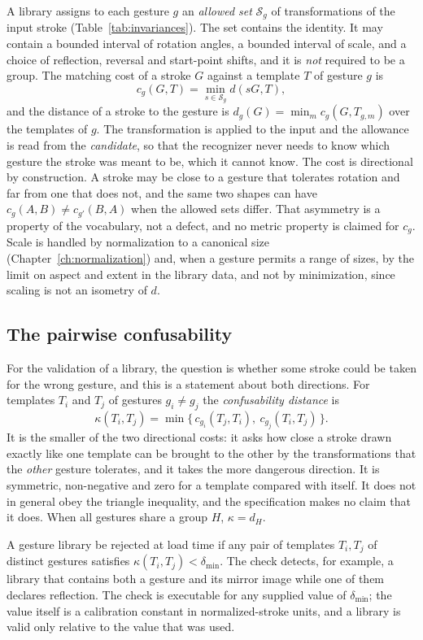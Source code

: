 A library assigns to each gesture $g$ an \emph{allowed set} $\mathcal S_g$ of transformations of the input stroke (Table~\ref{tab:invariances}). The set contains the identity. It may contain a bounded interval of rotation angles, a bounded interval of scale, and a choice of reflection, reversal and start-point shifts, and it is \emph{not} required to be a group. The matching cost of a stroke $G$ against a template $T$ of gesture $g$ is
\[
c_g(G,T)=\min_{s\in\mathcal S_g} d(sG,T),
\]
and the distance of a stroke to the gesture is $d_g(G)=\min_m c_g(G,T_{g,m})$ over the templates of $g$. The transformation is applied to the input and the allowance is read from the \emph{candidate}, so that the recognizer never needs to know which gesture the stroke was meant to be, which it cannot know. The cost is directional by construction. A stroke may be close to a gesture that tolerates rotation and far from one that does not, and the same two shapes can have $c_{g}(A,B)\ne c_{g'}(B,A)$ when the allowed sets differ. That asymmetry is a property of the vocabulary, not a defect, and no metric property is claimed for $c_g$. Scale is handled by normalization to a canonical size (Chapter~\ref{ch:normalization}) and, when a gesture permits a range of sizes, by the limit on aspect and extent in the library data, and not by minimization, since scaling is not an isometry of $d$.

\subsection*{The pairwise confusability}

For the validation of a library, the question is whether some stroke could be taken for the wrong gesture, and this is a statement about both directions. For templates $T_i$ and $T_j$ of gestures $g_i\ne g_j$ the \emph{confusability distance} is
\[
\kappa(T_i,T_j)=\min\bigl\{\,c_{g_i}(T_j,T_i),\ c_{g_j}(T_i,T_j)\,\bigr\}.
\]
It is the smaller of the two directional costs: it asks how close a stroke drawn exactly like one template can be brought to the other by the transformations that the \emph{other} gesture tolerates, and it takes the more dangerous direction. It is symmetric, non-negative and zero for a template compared with itself. It does not in general obey the triangle inequality, and the specification makes no claim that it does. When all gestures share a group $H$, $\kappa=d_H$.

\begin{requirement}\label{req:library-validity}
A gesture library \must{} be rejected at load time if any pair of templates $T_i,T_j$ of distinct gestures satisfies $\kappa(T_i,T_j)<\delta_{\min}$. The check detects, for example, a library that contains both a gesture and its mirror image while one of them declares reflection. The check is executable for any supplied value of $\delta_{\min}$; the value itself is a calibration constant\evC{} in normalized-stroke units, and a library is valid only relative to the value that was used.\evS
\end{requirement}

